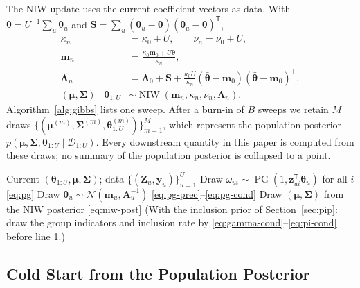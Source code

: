 \documentclass[lettersize,journal]{IEEEtran}
\newcommand{\Normal}{\mathcal{N}}
\newcommand{\NIW}{\operatorname{NIW}}
\newcommand{\PG}{\operatorname{PG}}
\newcommand{\T}{\mathsf{T}}
\newcommand{\D}{\mathcal{D}}
\begin{document}
The NIW update uses the current coefficient vectors as data. With $\bar{\bm\theta}=U^{-1}\sum_u\bm\theta_u$ and $\bm S=\sum_u(\bm\theta_u-\bar{\bm\theta})(\bm\theta_u-\bar{\bm\theta})^{\T}$,
\begin{align}
 \kappa_n&=\kappa_0+U,\qquad \nu_n=\nu_0+U,\nonumber\\
 \bm m_n&=\frac{\kappa_0\bm m_0+U\bar{\bm\theta}}{\kappa_n},\nonumber\\
 \bm\Lambda_n&=\bm\Lambda_0+\bm S+\frac{\kappa_0U}{\kappa_n}(\bar{\bm\theta}-\bm m_0)(\bar{\bm\theta}-\bm m_0)^{\T},\nonumber\\
 (\bm\mu,\bm\Sigma)\mid\bm\theta_{1:U}&\sim\NIW(\bm m_n,\kappa_n,\nu_n,\bm\Lambda_n).
 \label{eq:niw-post}
\end{align}
Algorithm~\ref{alg:gibbs} lists one sweep. After a burn-in of $B$ sweeps we retain $M$ draws $\{(\bm\mu^{(m)},\bm\Sigma^{(m)},\bm\theta^{(m)}_{1:U})\}_{m=1}^{M}$, which represent the population posterior $p(\bm\mu,\bm\Sigma,\bm\theta_{1:U}\mid\D_{1:U})$. Every downstream quantity in this paper is computed from these draws; no summary of the population posterior is collapsed to a point.

\begin{algorithm}[t]
\caption{One sweep of the population Gibbs sampler}
\label{alg:gibbs}
\begin{algorithmic}[1]
\REQUIRE Current $(\bm\theta_{1:U},\bm\mu,\bm\Sigma)$; data $\{(\bm Z_u,\bm y_u)\}_{u=1}^{U}$
  \STATE Draw $\omega_{ui}\sim\PG(1,\bm z_{ui}^{\T}\bm\theta_u)$ for all $i$ \hfill\eqref{eq:pg}
  \STATE Draw $\bm\theta_u\sim\Normal(\bm m_u,\bm A_u^{-1})$ \hfill\eqref{eq:pg-prec}--\eqref{eq:pg-cond}
\ENDFOR
\STATE Draw $(\bm\mu,\bm\Sigma)$ from the NIW posterior \hfill\eqref{eq:niw-post}
\STATE (With the inclusion prior of Section~\ref{sec:pip}: draw the group indicators and inclusion rate by \eqref{eq:gamma-cond}--\eqref{eq:pi-cond} before line 1.)
\end{algorithmic}
\end{algorithm}

\subsection{Cold Start from the Population Posterior}
\label{sec:coldstart}
\end{document}
